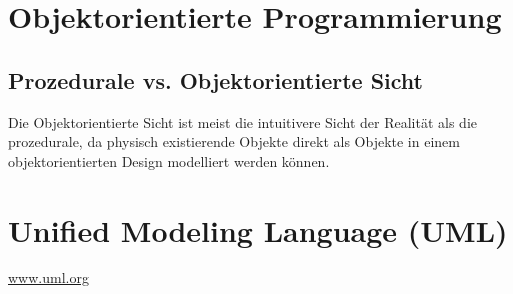 \section{Objektorientierte Programmierung}

\subsection{Prozedurale vs. Objektorientierte Sicht}
Die Objektorientierte Sicht ist meist die intuitivere Sicht der Realität als die prozedurale, da physisch existierende Objekte direkt als Objekte in einem objektorientierten Design modelliert werden können.

\clearpage
\section{Unified Modeling Language (UML)}
\href{www.uml.org}{www.uml.org}
\vspace{-\baselineskip}
